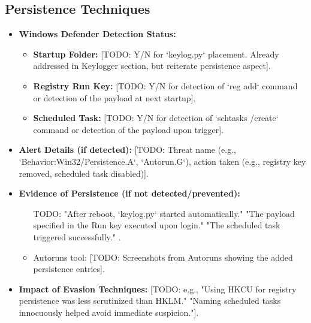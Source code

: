 \documentclass[11pt]{article}
\begin{document}
	\subsection{Persistence Techniques}
	\begin{itemize}
		\item \textbf{Windows Defender Detection Status:}
		\begin{itemize}
			\item \textbf{Startup Folder:} [TODO: Y/N for `keylog.py` placement. Already addressed in Keylogger section, but reiterate persistence aspect].
			\item \textbf{Registry Run Key:} [TODO: Y/N for detection of `reg add` command or detection of the payload at next startup].
			\item \textbf{Scheduled Task:} [TODO: Y/N for detection of `schtasks /create` command or detection of the payload upon trigger].
		\end{itemize}
		\item \textbf{Alert Details (if detected):} [TODO: Threat name (e.g., `Behavior:Win32/Persistence.A`, `Autorun.G`), action taken (e.g., registry key removed, scheduled task disabled)].
		\item \textbf{Evidence of Persistence (if not detected/prevented):}
		\begin{itemize}
			\item [TODO: "After reboot, `keylog.py` started automatically." "The payload specified in the Run key executed upon login." "The scheduled task triggered successfully."].
			\item Autoruns tool: [TODO: Screenshots from Autoruns showing the added persistence entries].
		\end{itemize}
		\item \textbf{Impact of Evasion Techniques:} [TODO: e.g., "Using HKCU for registry persistence was less scrutinized than HKLM." "Naming scheduled tasks innocuously helped avoid immediate suspicion."].
	\end{itemize}
	
\end{document}

